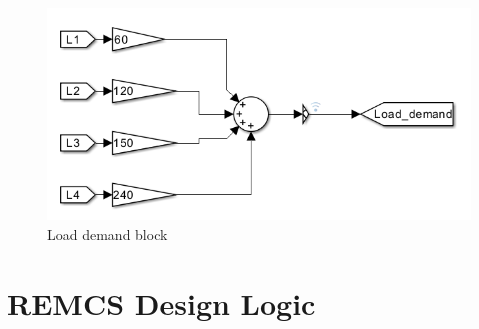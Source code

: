 \begin{figure}[H]
	\centering
	\includegraphics[totalheight=6cm]{Figures/load demand block.png}
	\caption{Load demand block}
\end{figure}
\section{REMCS Design Logic }
